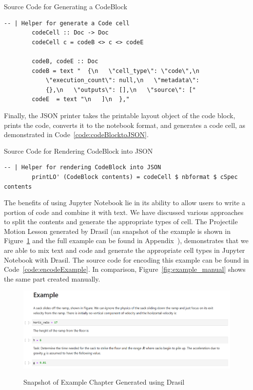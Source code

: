 \begin{listing}[h!]
	\caption{Source Code for Generating a CodeBlock}
	\label{code:codeBlock}
	\begin{lstlisting}[language=haskell1]		
		-- | Helper for generate a Code cell
		codeCell :: Doc -> Doc
		codeCell c = codeB <> c <> codeE
		
		codeB, codeE :: Doc
		codeB = text "  {\n   \"cell_type\": \"code\",\n   
			\"execution_count\": null,\n   \"metadata\": 
			{},\n   \"outputs\": [],\n   \"source\": [" 
		codeE  = text "\n   ]\n  },"
		\end{lstlisting}
\end{listing}

Finally, the JSON printer takes the printable layout object of the code block, 
prints the code, converts it to the notebook format, and generates a code cell, 
as demonstrated in Code~\ref{code:codeBlocktoJSON}.

\begin{listing}[h!]
	\caption{Source Code for Rendering CodeBlock into JSON}
	\label{code:codeBlocktoJSON}
	\begin{lstlisting}[language=haskell1]
		-- | Helper for rendering CodeBlock into JSON
		printLO' (CodeBlock contents) = codeCell $ nbformat $ cSpec contents
	\end{lstlisting}
\end{listing}

The benefits of using Jupyter Notebook lie in its ability to allow users to 
write a portion of code and combine it with text. We have discussed various 
approaches to split the contents and generate the appropriate types of cell. 
The Projectile Motion Lesson generated by Drasil (an snapshot of the example is 
shown in Figure~\ref{fig:example_drasil} and the full example can be found in 
Appendix~), demonstrates that we are able to mix text and 
code and generate the appropriate cell types in Jupyter Notebook with Drasil. 
The source code for encoding this example can be found in 
Code~\ref{code:encodeExample}. In comparison, Figure~\ref{fig:example_manual} 
shows the same part created manually.

\begin{figure}[h!]
	\caption{Snapshot of Example Chapter Generated using Drasil}
	\includegraphics[width=1\textwidth]{figures/example_drasil.png}
	\label{fig:example_drasil}
\end{figure}

